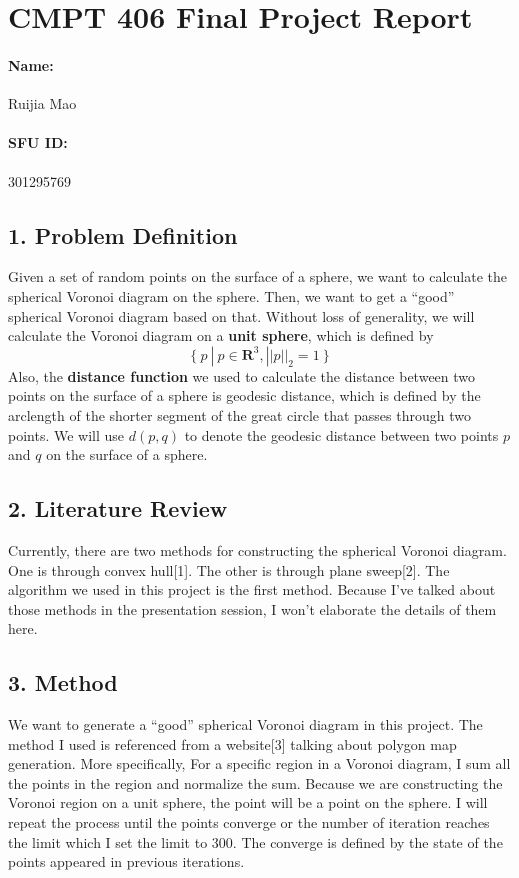 \documentclass{article}
\newcommand{\quotes}[1]{``#1''}
\begin{document}
\section*{CMPT 406 Final Project Report}
\paragraph{Name:} Ruijia Mao
\paragraph{SFU ID:} 301295769
\subsection*{1. Problem Definition}
Given a set of random points on the surface of a sphere, we want to calculate the spherical Voronoi diagram on the sphere. Then, we want to get a \quotes{good} spherical Voronoi diagram based on that. Without loss of generality, we will calculate the Voronoi diagram on a \textbf{unit sphere}, which is defined by
\begin{equation}
\{\ p\ |\ p \in \mathbf{R}^3, ||p||_2 = 1\ \}
\end{equation}
Also, the \textbf{distance function} we used to calculate the distance between two points on the surface of a sphere is geodesic distance, which is defined by the arclength of the shorter segment of the great circle that passes through two points. We will use $d(p, q)$ to denote the geodesic distance between two points $p$ and $q$ on the surface of a sphere. 
\subsection*{2. Literature Review}
Currently, there are two methods for constructing the spherical Voronoi diagram. One is through convex hull[1]. The other is through plane sweep[2]. The algorithm we used in this project is the first method. Because I've talked about those methods in the presentation session, I won't elaborate the details of them here. 
\\
\subsection*{3. Method}
We want to generate a \quotes{good} spherical Voronoi diagram in this project. The method I used is referenced from a website[3] talking about polygon map generation. More specifically, For a specific region in a Voronoi diagram, I sum all the points in the region and normalize the sum. Because we are constructing the Voronoi region on a unit sphere, the point will be a point on the sphere. I will repeat the process until the points converge or the number of iteration reaches the limit which I set the limit to 300. The converge is defined by the state of the points appeared in previous iterations. 
\end{document}
